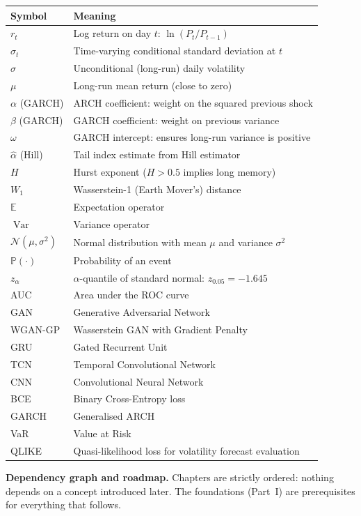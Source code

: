 \documentclass[11pt,openany]{book}
\newcommand{\E}{\mathbb{E}}
\newcommand{\Var}{\operatorname{Var}}
\newcommand{\Prob}{\mathbb{P}}
\newcommand{\N}{\mathcal{N}}
\theoremstyle{definition}
\theoremstyle{remark}
\begin{document}
\begin{tabular}{@{}p{2.5cm}p{10cm}@{}}
\toprule
\textbf{Symbol} & \textbf{Meaning} \\
\midrule
$r_t$ & Log return on day $t$: $\ln(P_t/P_{t-1})$ \\
$\sigma_t$ & Time-varying conditional standard deviation at $t$ \\
$\sigma$ & Unconditional (long-run) daily volatility \\
$\mu$ & Long-run mean return (close to zero) \\
$\alpha$ (GARCH) & ARCH coefficient: weight on the squared previous shock \\
$\beta$ (GARCH) & GARCH coefficient: weight on previous variance \\
$\omega$ & GARCH intercept: ensures long-run variance is positive \\
$\hat{\alpha}$ (Hill) & Tail index estimate from Hill estimator \\
$H$ & Hurst exponent ($H>0.5$ implies long memory) \\
$W_1$ & Wasserstein-1 (Earth Mover's) distance \\
$\E$ & Expectation operator \\
$\Var$ & Variance operator \\
$\N(\mu,\sigma^2)$ & Normal distribution with mean $\mu$ and variance $\sigma^2$ \\
$\Prob(\cdot)$ & Probability of an event \\
$z_\alpha$ & $\alpha$-quantile of standard normal: $z_{0.05}=-1.645$ \\
AUC & Area under the ROC curve \\
GAN & Generative Adversarial Network \\
WGAN-GP & Wasserstein GAN with Gradient Penalty \\
GRU & Gated Recurrent Unit \\
TCN & Temporal Convolutional Network \\
CNN & Convolutional Neural Network \\
BCE & Binary Cross-Entropy loss \\
GARCH & Generalised ARCH \\
VaR & Value at Risk \\
QLIKE & Quasi-likelihood loss for volatility forecast evaluation \\
\bottomrule
\end{tabular}

\vspace{1cm}
\textbf{Dependency graph and roadmap.}
Chapters are strictly ordered: nothing depends on a concept introduced later.
The foundations (Part~I) are prerequisites for everything that follows.
\end{document}

